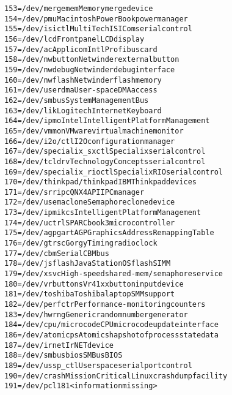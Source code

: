 \documentclass[a4paper,8pt,english]{sphinxmanual}
\begin{document}
\begin{alltt}
                153 = /dev/mergemem     Memory merge device
                154 = /dev/pmu          Macintosh PowerBook power manager
                155 = /dev/isictl       MultiTech ISICom serial control
                156 = /dev/lcd          Front panel LCD display
                157 = /dev/ac           Applicom Intl Profibus card
                158 = /dev/nwbutton     Netwinder external button
                159 = /dev/nwdebug      Netwinder debug interface
                160 = /dev/nwflash      Netwinder flash memory
                161 = /dev/userdma      User-space DMA access
                162 = /dev/smbus        System Management Bus
                163 = /dev/lik          Logitech Internet Keyboard
                164 = /dev/ipmo         Intel Intelligent Platform Management
                165 = /dev/vmmon        VMware virtual machine monitor
                166 = /dev/i2o/ctl      I2O configuration manager
                167 = /dev/specialix\_sxctl Specialix serial control
                168 = /dev/tcldrv       Technology Concepts serial control
                169 = /dev/specialix\_rioctl Specialix RIO serial control
                170 = /dev/thinkpad/thinkpad    IBM Thinkpad devices
                171 = /dev/srripc       QNX4 API IPC manager
                172 = /dev/usemaclone   Semaphore clone device
                173 = /dev/ipmikcs      Intelligent Platform Management
                174 = /dev/uctrl        SPARCbook 3 microcontroller
                175 = /dev/agpgart      AGP Graphics Address Remapping Table
                176 = /dev/gtrsc        Gorgy Timing radio clock
                177 = /dev/cbm          Serial CBM bus
                178 = /dev/jsflash      JavaStation OS flash SIMM
                179 = /dev/xsvc         High-speed shared-mem/semaphore service
                180 = /dev/vrbuttons    Vr41xx button input device
                181 = /dev/toshiba      Toshiba laptop SMM support
                182 = /dev/perfctr      Performance-monitoring counters
                183 = /dev/hwrng        Generic random number generator
                184 = /dev/cpu/microcode CPU microcode update interface
                186 = /dev/atomicps     Atomic shapshot of process state data
                187 = /dev/irnet        IrNET device
                188 = /dev/smbusbios    SMBus BIOS
                189 = /dev/ussp\_ctl     User space serial port control
                190 = /dev/crash        Mission Critical Linux crash dump facility
                191 = /dev/pcl181       \textless{}information missing\textgreater{}

\end{alltt}
\end{document}
